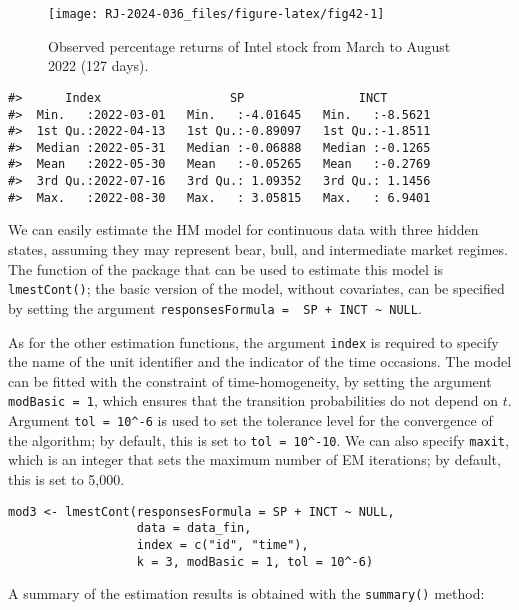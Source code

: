 \begin{figure}

{\centering \texttt{[image: RJ-2024-036\_files/figure-latex/fig42-1]} 

}

\caption{Observed percentage returns of Intel stock from March to August 2022  (127 days).}\label{fig:fig42}
\end{figure}

\begin{verbatim}
#>      Index                  SP                INCT        
#>  Min.   :2022-03-01   Min.   :-4.01645   Min.   :-8.5621  
#>  1st Qu.:2022-04-13   1st Qu.:-0.89097   1st Qu.:-1.8511  
#>  Median :2022-05-31   Median :-0.06888   Median :-0.1265  
#>  Mean   :2022-05-30   Mean   :-0.05265   Mean   :-0.2769  
#>  3rd Qu.:2022-07-16   3rd Qu.: 1.09352   3rd Qu.: 1.1456  
#>  Max.   :2022-08-30   Max.   : 3.05815   Max.   : 6.9401
\end{verbatim}

We can easily estimate the HM model for continuous data with three
hidden states, assuming they may represent bear, bull, and intermediate
market regimes. The function of the package that can be used to estimate
this model is \texttt{lmestCont()}; the basic version of the model, without
covariates, can be specified by setting the argument
\texttt{responsesFormula\ =\ \ SP\ +\ INCT\ \textasciitilde{}\ NULL}.

As for the other estimation functions, the argument \texttt{index} is required
to specify the name of the unit identifier and the indicator of the time occasions. The
model can be fitted with the constraint of time-homogeneity, by setting
the argument \texttt{modBasic\ =\ 1}, which ensures that the transition
probabilities do not depend on \(t\). Argument \texttt{tol\ =\ 10\^{}-6} is used to
set the tolerance level for the convergence of the algorithm; by
default, this is set to \texttt{tol\ =\ 10\^{}-10}. We can also specify \texttt{maxit},
which is an integer that sets the maximum number of EM iterations; by
default, this is set to 5,000.

\begin{verbatim}
mod3 <- lmestCont(responsesFormula = SP + INCT ~ NULL,
                  data = data_fin,
                  index = c("id", "time"),
                  k = 3, modBasic = 1, tol = 10^-6)
\end{verbatim}

A summary of the estimation results is obtained with the \texttt{summary()}
method:

